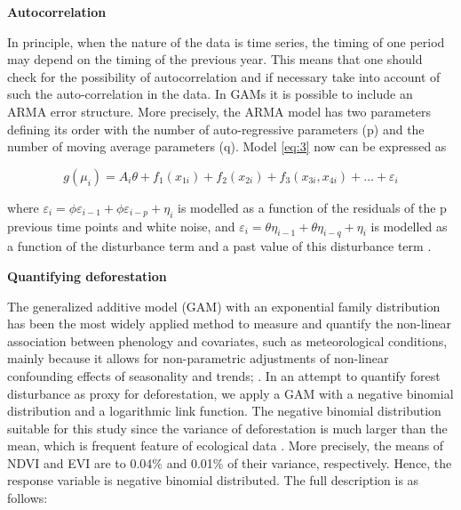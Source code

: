 


\textbf{Autocorrelation} %

In principle, when the nature of the data is time series, the timing of one period may depend on the timing of the previous year. This means that one should check for the possibility of autocorrelation and if necessary take into account of such the auto-correlation in the data. In GAMs it is possible to include an ARMA error structure. More precisely, the ARMA model has two parameters defining its order with the number of auto-regressive parameters (p) and the number of moving average parameters (q). Model \ref{eq:3} now can be expressed as


\begin{equation}  \label{eq:8} 
g(\mu_{i}) = A_{i} \theta + f_{1}(x_{1i}) + f_{2}(x_{2i}) + f_{3}(x_{3i},x_{4i}) + \dots + \varepsilon_{i}
\end{equation}

where $\varepsilon_{i} = {\phi}\varepsilon_{i-1} + {\phi}\varepsilon_{i-p} + \eta_{i} $ is modelled as a function of the residuals of the p previous time points and white noise, and $\varepsilon_{i} = {\theta}\eta_{i-1} + {\theta}\eta_{i-q} + \eta_{i}$ is modelled as a function of the disturbance term and a past value of this disturbance term \citep{zuur_saveliev_ieno_2014}.

\textbf{Quantifying deforestation} 

The generalized additive model (GAM) with an exponential family distribution has been the most widely applied method to measure and quantify the non-linear association between phenology and covariates, such as meteorological conditions, mainly because it allows for non-parametric adjustments of non-linear confounding effects of seasonality and trends; \citep{alkemad_1998,BELL_2015,JOYE_2015,LUSK_2016,SADAT_2016,HALPERIN_2016, SANTOS_2017,TAPIA_2017,LIU_2018,MORENO_2018}.  In an attempt to quantify forest disturbance as proxy for deforestation, we apply a GAM with a negative binomial distribution and a logarithmic link function. The negative binomial distribution suitable for this study since the variance of deforestation is much larger than the mean, which is frequent feature of ecological data \citep{zuur_2011}. More precisely, the means of NDVI and EVI are to 0.04\% and 0.01\% of their variance, respectively. Hence, the response variable is negative binomial distributed. The full description is as follows:

